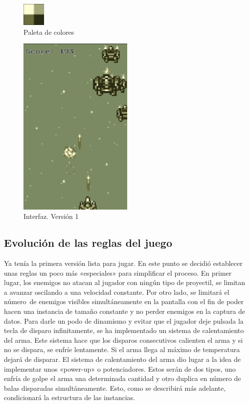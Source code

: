 \begin{figure}[]
\centering
\includegraphics[width=0.1\textwidth]{./img/paleta_de_colores}
\caption{Paleta de colores}
\end{figure}

\begin{figure}[]
\centering
\includegraphics[width=0.5\textwidth]{./img/ifaz_v1}
\caption{Interfaz. Versión 1}
\end{figure}

\subsection{Evolución de las reglas del juego}

Ya tenía la primera versión lista para jugar. En este punto se decidió establecer unas reglas un poco más «especiales» para simplificar el proceso. En primer lugar, los enemigos no atacan al jugador con ningún tipo de proyectil, se limitan a avanzar oscilando a una velocidad constante. Por otro lado, se limitará el número\ de enemigos visibles simultáneamente en la pantalla con el fin de poder hacen una instancia de tamaño constante y no perder enemigos en la captura de datos. Para darle un podo de dinamismo y evitar que el jugador deje pulsada la tecla de disparo infinitamente, se ha implementado un sistema de calentamiento del arma. Este sistema hace que los disparos consecutivos calienten el arma y si no se dispara, se enfríe lentamente. Si el arma llega al máximo de temperatura dejará de disparar. El sistema de calentamiento del arma dio lugar a la idea de implementar unos «power-up» o potenciadores. Estos serán de dos tipos, uno enfría de golpe el arma una determinada cantidad y otro duplica en número de balas disparadas simultáneamente. Esto, como se describirá más adelante, condicionará la estructura de las instancias.

